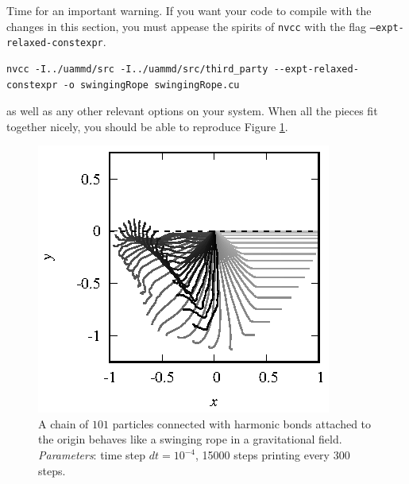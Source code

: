 Time for an important warning. If you want your code to compile with the changes
in this section, you must appease the spirits of \texttt{nvcc} with the flag
\texttt{--expt-relaxed-constexpr}.
\begin{lstlisting}
nvcc -I../uammd/src -I../uammd/src/third_party --expt-relaxed-constexpr -o swingingRope swingingRope.cu
\end{lstlisting}
as well as any other relevant options on your system. When all the pieces fit
together nicely, you should be able to reproduce Figure \ref{swingingRope}.

\begin{figure}[t]
  \centering
  \includegraphics[width = 0.6 \textwidth]{figures/swingingRope.eps}
  \caption{\label{swingingRope}A chain of $101$ particles connected with
           harmonic bonds attached to the origin behaves like a swinging rope
           in a gravitational field. \textit{Parameters}: time step
           $dt = 10^{-4}$, 15000 steps printing every 300 steps.}
\end{figure}


